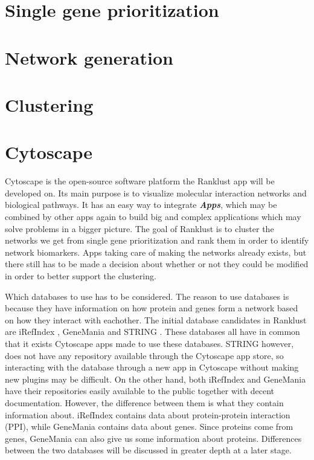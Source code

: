 \documentclass[UKenglish,11pt,a4paper]{article}
\begin{document}
\section{Single gene prioritization}
\section{Network generation}
\section{Clustering}
\section{Cytoscape}
Cytoscape is the open-source software platform the Ranklust app will be developed on. Its main purpose is to visualize
molecular interaction networks and biological pathways. It has an easy way to integrate \textbf{\textit{Apps}}, which may
be combined by other apps again to build big and complex applications which may solve problems in a bigger picture. The
goal of Ranklust is to cluster the networks we get from single gene prioritization and rank them in order to identify
network biomarkers. Apps taking care of making the networks already exists, but there still has to be made a decision
about whether or not they could be modified in order to better support the clustering.

Which databases to use has to be considered. The reason to use databases is because they have information on how protein 
and genes form a network based on how they interact with eachother. The initial database candidates in Ranklust are
iRefIndex \cite{iri}, GeneMania \cite{gm} and STRING \cite{str}. These databases all have in common that it exists
Cytoscape apps made to use these databases. STRING however, does not have any repository available through the Cytoscape
app store, so interacting with the database through a new app in Cytoscape without making new plugins may be difficult.
On the other hand, both iRefIndex and GeneMania have their repositories easily available to the public together with
decent documentation. However, the difference between them is what they contain information about. iRefIndex contains
data about protein-protein interaction (PPI), while GeneMania contains data about genes.
Since proteins come from genes, GeneMania can also give us some information about proteins. Differences between the
two databases will be discussed in greater depth at a later stage.
\end{document}
